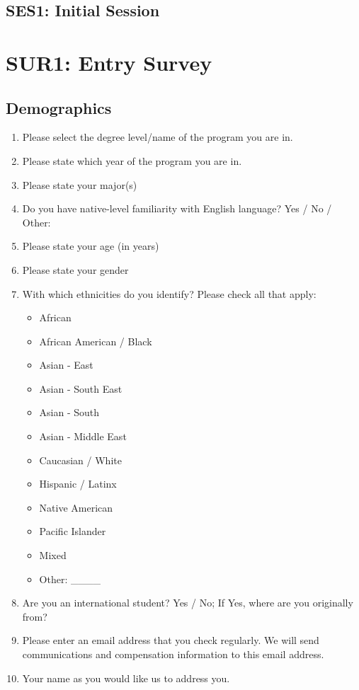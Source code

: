 \documentclass[letterpaper, nobind]{templates/ociamthesis}
\providecommand{\tightlist}{%
  \setlength{\itemsep}{0pt}\setlength{\parskip}{0pt}}
\begin{document}
\hypertarget{ses1-initial-session-1}{%
\section{SES1: Initial Session}\label{ses1-initial-session-1}}

\hypertarget{app-signup-survey}{%
\chapter{SUR1: Entry Survey}\label{app-signup-survey}}

\hypertarget{app-demographics}{%
\section{Demographics}\label{app-demographics}}

\begin{enumerate}
\def\labelenumi{\arabic{enumi}.}
\tightlist
\item
  Please select the degree level/name of the program you are in.
\item
  Please state which year of the program you are in.
\item
  Please state your major(s)
\item
  Do you have native-level familiarity with English language? Yes / No
  / Other:
\item
  Please state your age (in years)
\item
  Please state your gender
\item
  With which ethnicities do you identify? Please check all that apply:

  \begin{itemize}
  \tightlist
  \item
    African
  \item
    African American / Black
  \item
    Asian - East
  \item
    Asian - South East
  \item
    Asian - South
  \item
    Asian - Middle East
  \item
    Caucasian / White
  \item
    Hispanic / Latinx
  \item
    Native American
  \item
    Pacific Islander
  \item
    Mixed
  \item
    Other: \_\_\_\_
  \end{itemize}
\item
  Are you an international student? Yes / No; If Yes, where are you originally from?
\item
  Please enter an email address that you check regularly. We will send communications and compensation information to this email address.
\item
  Your name as you would like us to address you.
\end{enumerate}
\end{document}
